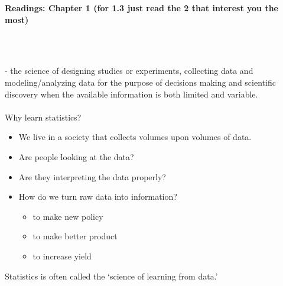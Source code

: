 \begin{center}\large\textbf{Readings: Chapter 1 (for 1.3 just read the 2 that interest you the most)}\\
\normalsize \end{center}
\large ~\hrulefill~\\~\\
\normalsize

\underbar{~~~~~~~~~~~~~~~~~~~~~~~~~} - the science of designing studies or experiments, collecting data and modeling/analyzing data for the purpose of decisions making and scientific discovery when the available information is both limited and variable.\\~\\

Why learn statistics?
\begin{itemize}
\item	We live in a society that collects volumes upon volumes of data.  
\item Are people looking at the data? 
\item	Are they interpreting the data properly?  
\item How do we turn raw data into information?
\begin{itemize}
\item	to make new policy
\item	to make better product
\item to increase yield
\end{itemize}
\end{itemize}

Statistics is often called the `science of learning from data.'\\~\\

\newpage

